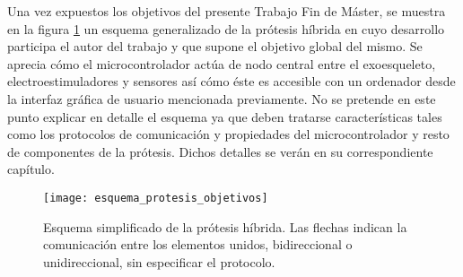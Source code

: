 Una vez expuestos los objetivos del presente Trabajo Fin de Máster, se muestra en la figura \ref{fig:esquema_protesis_objetivos} un esquema generalizado de la prótesis híbrida en cuyo desarrollo participa el autor del trabajo y que supone el objetivo global del mismo. Se aprecia cómo el microcontrolador actúa de nodo central entre el exoesqueleto, electroestimuladores y sensores así cómo éste es accesible con un ordenador desde la interfaz gráfica de usuario mencionada previamente. No se pretende en este punto explicar en detalle el esquema ya que deben tratarse características tales como los protocolos de comunicación y propiedades del microcontrolador y resto de componentes de la prótesis. Dichos detalles se verán en su correspondiente capítulo.\\

\begin{figure}[!htb]
\centering
\texttt{[image: esquema\_protesis\_objetivos]}
  \caption{Esquema simplificado de la prótesis híbrida. Las flechas indican la comunicación entre los elementos unidos, bidireccional o unidireccional, sin especificar el protocolo.}\label{fig:esquema_protesis_objetivos}
\end{figure}

